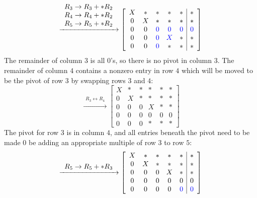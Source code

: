 \documentclass{article}
\newcommand{\blue}[1]{\textcolor{blue}{#1}}
\begin{document}
\[\xrightarrow{\begin{array}{c} R_3 \rightarrow R_3 + *R_2 \\ R_4 \rightarrow R_4 + *R_2 \\ R_5 \rightarrow R_5 + *R_2 \end{array}} \left[\begin{array}{ccccc|c}
X & * & * & * & * & * \\
0 & X & * & * & * & * \\
0 & 0 & \blue{0} & \blue{0} & \blue{0} & \blue{0} \\
0 & 0 & \blue{0} & \blue{X} & * & * \\
0 & 0 & \blue{0} & * & * & * 
\end{array}\right]\]
The remainder of column \(3\) is all \(0\)'s, so there is no pivot in column \(3\). The remainder of column \(4\) contains a nonzero entry in row \(4\) which will be moved to be the pivot of row \(3\) by swapping rows \(3\) and \(4\):
\[\xrightarrow{\begin{array}{c} R_3 \leftrightarrow R_4 \end{array}} \left[\begin{array}{ccccc|c}
X & * & * & * & * & * \\
0 & X & * & * & * & * \\
0 & 0 & 0 & X & * & * \\
0 & 0 & 0 & 0 & 0 & 0 \\
0 & 0 & 0 & * & * & * 
\end{array}\right]\]
The pivot for row \(3\) is in column \(4\), and all entries beneath the pivot need to be made \(0\) be adding an appropriate multiple of row \(3\) to row \(5\):
\[\xrightarrow{\begin{array}{c} R_5 \rightarrow R_5 + *R_3 \end{array}} \left[\begin{array}{ccccc|c}
X & * & * & * & * & * \\
0 & X & * & * & * & * \\
0 & 0 & 0 & X & * & * \\
0 & 0 & 0 & 0 & 0 & 0 \\
0 & 0 & 0 & 0 & \blue{0} & \blue{0} 
\end{array}\right]\]
\end{document}
